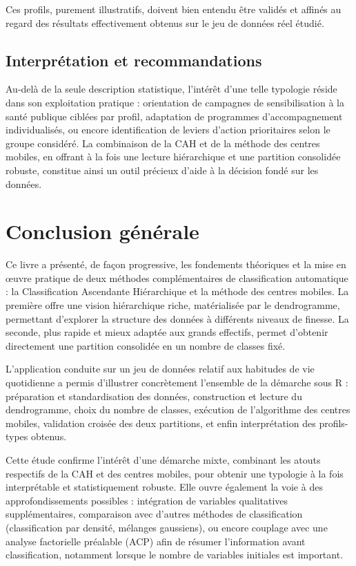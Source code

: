 \documentclass[11pt,a4paper]{report}
\begin{document}
	Ces profils, purement illustratifs, doivent bien entendu être validés et affinés au regard des résultats effectivement obtenus sur le jeu de données réel étudié.
	
	\section{Interprétation et recommandations}
	
	Au-delà de la seule description statistique, l'intérêt d'une telle typologie réside dans son exploitation pratique : orientation de campagnes de sensibilisation à la santé publique ciblées par profil, adaptation de programmes d'accompagnement individualisés, ou encore identification de leviers d'action prioritaires selon le groupe considéré. La combinaison de la CAH et de la méthode des centres mobiles, en offrant à la fois une lecture hiérarchique et une partition consolidée robuste, constitue ainsi un outil précieux d'aide à la décision fondé sur les données.
	
	\chapter*{Conclusion générale}
	
	Ce livre a présenté, de façon progressive, les fondements théoriques et la mise en œuvre pratique de deux méthodes complémentaires de classification automatique : la Classification Ascendante Hiérarchique et la méthode des centres mobiles. La première offre une vision hiérarchique riche, matérialisée par le dendrogramme, permettant d'explorer la structure des données à différents niveaux de finesse. La seconde, plus rapide et mieux adaptée aux grands effectifs, permet d'obtenir directement une partition consolidée en un nombre de classes fixé.
	
	L'application conduite sur un jeu de données relatif aux habitudes de vie quotidienne a permis d'illustrer concrètement l'ensemble de la démarche sous R : préparation et standardisation des données, construction et lecture du dendrogramme, choix du nombre de classes, exécution de l'algorithme des centres mobiles, validation croisée des deux partitions, et enfin interprétation des profils-types obtenus.
	
	Cette étude confirme l'intérêt d'une démarche mixte, combinant les atouts respectifs de la CAH et des centres mobiles, pour obtenir une typologie à la fois interprétable et statistiquement robuste. Elle ouvre également la voie à des approfondissements possibles : intégration de variables qualitatives supplémentaires, comparaison avec d'autres méthodes de classification (classification par densité, mélanges gaussiens), ou encore couplage avec une analyse factorielle préalable (ACP) afin de résumer l'information avant classification, notamment lorsque le nombre de variables initiales est important.
	
\end{document}
